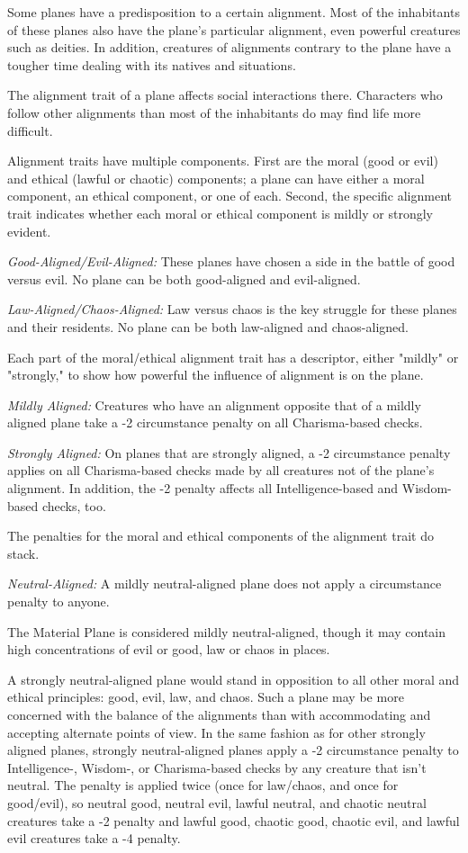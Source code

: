 Some planes have a predisposition to a certain alignment. Most of the inhabitants 
of these planes also have the plane's particular alignment, even powerful creatures 
such as deities. In addition, creatures of alignments contrary to the plane have 
a tougher time dealing with its natives and situations.

The alignment trait of a plane affects social interactions there. Characters who 
follow other alignments than most of the inhabitants do may find life more difficult.

Alignment traits have multiple components. First are the moral (good or evil) and 
ethical (lawful or chaotic) components; a plane can have either a moral component, 
an ethical component, or one of each. Second, the specific alignment trait indicates 
whether each moral or ethical component is mildly or strongly evident.

\textit{Good-Aligned/Evil-Aligned:} These planes have chosen a side in the battle 
of good versus evil. No plane can be both good-aligned and evil-aligned.

\textit{Law-Aligned/Chaos-Aligned:} Law versus chaos is the key struggle for these 
planes and their residents. No plane can be both law-aligned and chaos-aligned.

\vspace{12pt}
Each part of the moral/ethical alignment trait has a descriptor, either "mildly" 
or "strongly," to show how powerful the influence of alignment is on the plane.

\textit{Mildly Aligned:} Creatures who have an alignment opposite that of a mildly 
aligned plane take a -2 circumstance penalty on all Charisma-based checks.

\textit{Strongly Aligned:} On planes that are strongly aligned, a -2 circumstance 
penalty applies on all Charisma-based checks made by all creatures not of the plane's 
alignment. In addition, the -2 penalty affects all Intelligence-based and Wisdom-based 
checks, too.

The penalties for the moral and ethical components of the alignment trait do stack.

\textit{Neutral-Aligned:} A mildly neutral-aligned plane does not apply a circumstance 
penalty to anyone.

The Material Plane is considered mildly neutral-aligned, though it may contain 
high concentrations of evil or good, law or chaos in places.

A strongly neutral-aligned plane would stand in opposition to all other moral and 
ethical principles: good, evil, law, and chaos. Such a plane may be more concerned 
with the balance of the alignments than with accommodating and accepting alternate 
points of view. In the same fashion as for other strongly aligned planes, strongly 
neutral-aligned planes apply a -2 circumstance penalty to Intelligence-, Wisdom-, 
or Charisma-based checks by any creature that isn't neutral. The penalty is applied 
twice (once for law/chaos, and once for good/evil), so neutral good, neutral evil, 
lawful neutral, and chaotic neutral creatures take a -2 penalty and lawful good, 
chaotic good, chaotic evil, and lawful evil creatures take a -4 penalty.

